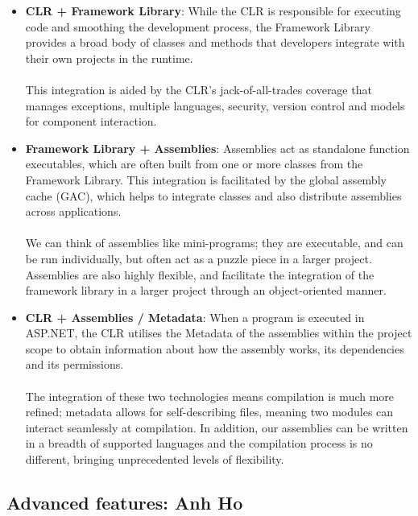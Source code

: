 \documentclass[a4paper, 11pt]{report}
\begin{document}
    \begin{itemize}
        \item \textbf{CLR + Framework Library}: While the CLR is responsible for executing code and smoothing the development process, the Framework Library provides a broad body of classes and methods that developers integrate with their own projects in the runtime.
        \\
        \\This integration is aided by the CLR's jack-of-all-trades coverage that manages exceptions, multiple languages, security, version control and models for component interaction.

        \item \textbf{Framework Library + Assemblies}: Assemblies act as standalone function executables, which are often built from one or more classes from the Framework Library. This integration is facilitated by the global assembly cache (GAC), which helps to integrate classes and also distribute assemblies across applications.
        \\
        \\We can think of assemblies like mini-programs; they are executable, and can be run individually, but often act as a puzzle piece in a larger project. Assemblies are also highly flexible, and facilitate the integration of the framework library in a larger project through an object-oriented manner.

        \item \textbf{CLR + Assemblies / Metadata}: When a program is executed in ASP.NET, the CLR utilises the Metadata of the assemblies within the project scope to obtain information about how the assembly works, its dependencies and its permissions.
        \\
        \\The integration of these two technologies means compilation is much more refined; metadata allows for self-describing files, meaning two modules can interact seamlessly at compilation. In addition, our assemblies can be written in a breadth of supported languages and the compilation process is no different, bringing unprecedented levels of flexibility.

    \end{itemize}

	
    	
	\subsection{Advanced features: Anh Ho}
	
\end{document}
